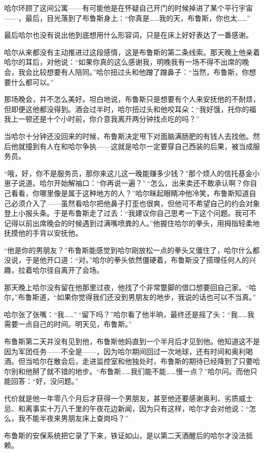 \documentclass[../main.tex]{subfiles}
\begin{document}
哈尔环顾了这间公寓——有可能他是在怀疑自己开门的时候掉进了某个平行宇宙——，最后，目光落到了布鲁斯身上：“你真是……我的天，布鲁斯，你也太……”

最后哈尔也没有说出他到底想用什么形容词，只是在床上好好表达了一番感谢。

哈尔从来都没有主动推进过这段感情，这是布鲁斯的第二条线索。那天晚上他亲着哈尔的耳后，对他说：“如果你真的这么感谢我，明晚我有一场不得不出席的晚会，我会比较想要有人陪同。”哈尔扭过头和他蹭了蹭鼻子：“当然，布鲁斯，你想要什么都可以。”

那场晚会，并不怎么美好。坦白地说，布鲁斯只是想要有个人来安抚他的不耐烦，但即便这他都没得到。酒会过半时，哈尔扭过头和他咬耳朵：“我好饿，托你的福我上一顿还是十个小时前，你介意我离开两分钟找点吃的吗？”

当哈尔十分钟还没回来的时候，布鲁斯决定甩下对面脑满肠肥的有钱人去找他。然后他就撞到有人在和哈尔争执——这就是哈尔一定要穿自己西装的后果，被当成服务员。

“哦，好，你不是服务员，那你来这儿这一晚能赚多少钱？”那个烦人的信托基金小崽子说道。哈尔开始解袖口：“你再说一遍？”\,“怎么，出来卖还不敢承认啊？你自己看看，你哪里像是属于这种地方的人？”哈尔眯起眼睛冲他冷笑，布鲁斯知道自己必须介入了——虽然看哈尔把他鼻子打歪也很爽，但他可不希望自己的约会对象登上小报头条。于是布鲁斯走了过去：“我建议你自己思考一下这个问题。我可不记得以前出席晚会的时候遇到过满嘴喷粪的人。”他握住哈尔的拳头，用拇指轻柔地抚摸他的手背以安抚他。

“他是你的男朋友？”布鲁斯能感觉到哈尔刚放松一点的拳头又僵住了，哈尔什么都没说，于是他开口道：“对。”哈尔的拳头依然僵硬着，布鲁斯没了搭理任何人的兴趣，拉着哈尔径自离开了会场。

那天晚上哈尔没有留在他那里过夜，他找了个非常蹩脚的借口想要回自己家。“哈尔，”布鲁斯道，“如果你觉得我们还没到男朋友的地步，我说的话也可以不当真。”

哈尔张了张嘴：“我……”\,“留下吗？”哈尔看了他半晌，最终还是摇了头：“我……我需要一点自己的时间。明天见，布鲁斯。”

布鲁斯第二天并没有见到他，布鲁斯他妈直到一个半月后才见到他。他知道这不是因为军团任务——不全是——，因为哈尔期间回过一次地球，还有时间和奥利喝酒。但当哈尔在散会后，走进监控室和他独处时，布鲁斯的期待已经降到了只要哈尔别和他掰了就不错的地步。“布鲁斯……我们能不能……慢一点？”哈尔问。而他只能回答：“好，没问题。”

代价就是他一年零八个月后才获得一个男朋友，甚至他还要感谢奥利、劣质威士忌、和离事实十万八千里的午夜花边新闻，因为只有这样，哈尔才会对他说：“怎么，我不能半夜来男朋友床上查岗吗？”

布鲁斯的安保系统把它录了下来，铁证如山，是以第二天酒醒后的哈尔才没法抵赖。
\end{document}

